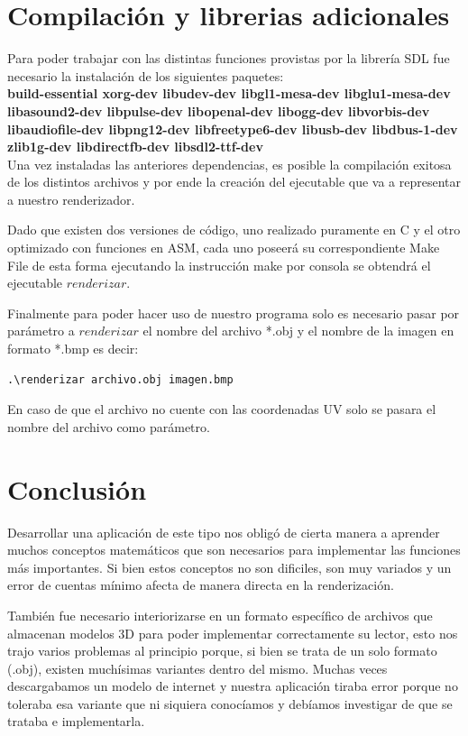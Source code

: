 \documentclass[a4paper]{article}
\begin{document}
\section{Compilación y librerias adicionales}

Para poder trabajar con las distintas funciones provistas por la librería SDL fue necesario la instalación de los siguientes paquetes: \\

\textbf{ build-essential xorg-dev libudev-dev libgl1-mesa-dev libglu1-mesa-dev libasound2-dev libpulse-dev libopenal-dev libogg-dev libvorbis-dev libaudiofile-dev libpng12-dev libfreetype6-dev libusb-dev libdbus-1-dev zlib1g-dev libdirectfb-dev libsdl2-ttf-dev } \\ 

Una vez instaladas las anteriores dependencias, es posible la compilación exitosa de los distintos archivos y por ende la creación del ejecutable que va a representar a nuestro renderizador.
\par Dado que existen dos versiones de código, uno realizado puramente en C y el otro optimizado con funciones en ASM, cada uno poseerá su correspondiente Make File de esta forma ejecutando la instrucción make por consola se obtendrá el ejecutable $renderizar$.
\par Finalmente para poder hacer uso de nuestro programa solo es necesario pasar por parámetro a $renderizar$ el nombre del archivo *.obj y el nombre de la imagen en formato *.bmp es decir:


\begin{verbatim}
.\renderizar archivo.obj imagen.bmp
\end{verbatim}



En caso de que el archivo no cuente con las coordenadas UV solo se pasara el nombre del archivo como parámetro.


\section{Conclusión}
Desarrollar una aplicación de este tipo nos obligó de cierta manera a aprender muchos conceptos matemáticos que son necesarios para implementar las funciones más importantes. Si bien estos conceptos no son dificiles, son muy variados y un error de cuentas mínimo afecta de manera directa en la renderización.

También fue necesario interiorizarse en un formato específico de archivos que almacenan modelos 3D para poder implementar correctamente su lector, esto nos trajo varios problemas al principio porque, si bien se trata de un solo formato (.obj), existen muchísimas variantes dentro del mismo. Muchas veces descargabamos un modelo de internet y nuestra aplicación tiraba error porque no toleraba esa variante que ni siquiera conocíamos y debíamos investigar de que se trataba e implementarla.
\end{document}
